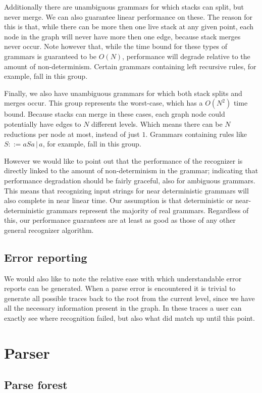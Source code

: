 \documentclass[a4paper,10pt]{article}
\begin{document}
Additionally there are unambiguous grammars for which stacks can split, but never merge. We can also guarantee linear performance on these. The reason for this is that, while there can be more then one live stack at any given point, each node in the graph will never have more then one edge, because stack merges never occur. Note however that, while the time bound for these types of grammars is guaranteed to be $O(N)$, performance will degrade relative to the amount of non-determinism. Certain grammars containing left recursive rules, for example, fall in this group.

Finally, we also have unambiguous grammars for which both stack splits and merges occur. This group represents the worst-case, which has a $O(N^2)$ time bound. Because stacks can merge in these cases, each graph node could potentially have edges to $N$ different levels. Which means there can be $N$ reductions per node at most, instead of just $1$. Grammars containing rules like $S ::= aSa\,|\,a$, for example, fall in this group.

However we would like to point out that the performance of the recognizer is directly linked to the amount of non-determinism in the grammar; indicating that performance degradation should be fairly graceful, also for ambiguous grammars. This means that recognizing input strings for near deterministic grammars will also complete in near linear time. Our assumption is that deterministic or near-deterministic grammars represent the majority of real grammars. Regardless of this, our performance guarantees are at least as good as those of any other general recognizer algorithm.

\subsection{Error reporting}

We would also like to note the relative ease with which understandable error reports can be generated. When a parse error is encountered it is trivial to generate all possible traces back to the root from the current level, since we have all the necessary information present in the graph. In these traces a user can exactly see where recognition failed, but also what did match up until this point.

\section{Parser}

\subsection{Parse forest}
\end{document}
